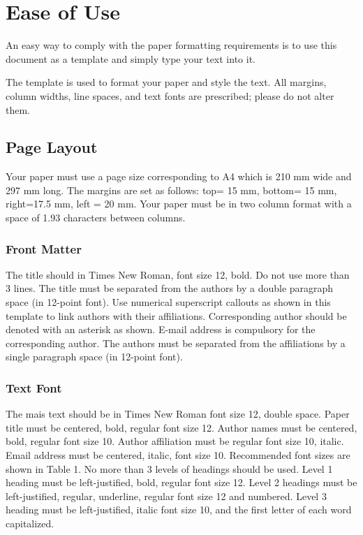 \documentclass[12pt, twocolumn, a4paper]{article}
\begin{document}
\section{Ease of Use}
An easy way to comply with the paper formatting requirements is to use this document as a template and simply type your text into it.

The template is used to format your paper and style the text. All margins, column widths, line spaces, and text fonts are prescribed; please do not alter them. 
\subsection{Page Layout}
Your paper must use a page size corresponding to A4 which is 210 mm wide and 297 mm long. The margins are set as follows: top= 15 mm, bottom= 15 mm, right=17.5 mm, left = 20 mm. Your paper must be in two column format with a space of 1.93 characters between columns.
\subsubsection{Front Matter}
The title should in Times New Roman, font size 12, bold. Do not use more than 3 lines. The title must be separated from the authors by a double paragraph space (in 12-point font). Use numerical superscript callouts as shown in this template to link authors with their affiliations.
Corresponding author should be denoted with an asterisk as shown. E-mail address is compulsory for the corresponding author.
The authors must be separated from the affiliations by a single paragraph space (in 12-point font).

\subsubsection{Text Font}

The mais text should be in Times New Roman font size 12, double space. Paper title must be centered, bold, regular font size 12. Author names must be centered, bold, regular font size 10. Author affiliation must be regular font size 10, italic. Email address must be centered, italic, font size 10. Recommended font sizes are shown in Table 1. No more than 3 levels of headings should be used. Level 1 heading must be left-justified, bold, regular font size 12. Level 2 headings must be left-justified, regular, underline, regular font size 12 and numbered. Level 3 heading must be left-justified, italic font size 10, and the first letter of each word capitalized.
\end{document}
